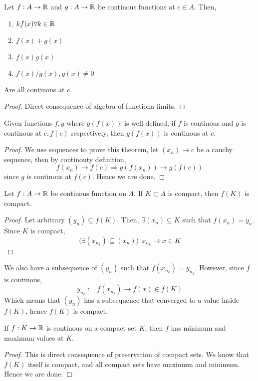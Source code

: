 \begin{theorem}
    Let $f: A \to {\mathbb{R}}$ and $g: A \to {\mathbb{R}}$ be continous functions at $c \in A$. Then,
    \begin{enumerate}
        \item $kf(x) \forall k \in {\mathbb{R}}$
        \item $f(x) +g(x)$
        \item $f(x)g(x)$
        \item $f(x)/g(x), g(x) \neq 0$
    \end{enumerate}
    Are all continous at $c$.
    \begin{proof}
        Direct consequence of algebra of functiona limits.
    \end{proof}
\end{theorem}
\begin{theorem}
    Given functions $f,g$ where  $g(f(x))$ is well defined, if $f$ is continous and $g$ is continous at $c,f(c)$ respectively, then $g(f(x))$ is continous at $c$.
    \begin{proof}
        We use sequences to prove this theorem, let $(x_n) \to c$ be a cauchy sequence, then by continouty definition,
        \[ f(x_n) \to f(c) \Rightarrow g(f(x_n)) \to g(f(c))\]
        since $g$ is continous at $f(c)$. Hence we are done.
    \end{proof}
\end{theorem}
\begin{theorem} Let $f: A \to {\mathbb{R}}$ be continous function on $A$. If $K \subset A$ is compact, then $f(K)$ is compact.
    \begin{proof}
        Let arbitrary $(y_n) \subseteq f(K)$. Then, $\exists (x_n) \subseteq K$ such that $f(x_n) = y_n$. Since $K$ is compact,
        \[ \bigg(\exists (x_{n_k}) \subseteq (x_n)\bigg) \:\ x_{n_k}\to x \in K\]
    \end{proof}
    We also have a subsequence of $(y_n)$ such that $f(x_{n_k}) = y_{n_k}$. However, since $f$ is continous,
    \[ y_{n_k} := f(x_{n_k}) \to f(x) \in f(K)\]
    Which means that $(y_n)$ has a subsequence that converged to a value inside $f(K)$, hence $f(K)$ is compact.
\end{theorem}
\begin{theorem} If $f:K \to {\mathbb{R}}$ is continous on a compact set $K$, then $f$ has minimum and maximum values at $K$.
    \begin{proof}
        This is direct consequence of preservation of compact sets. We know that $f(K)$ itself is compact, and all compact sets have maximum and minimum. Hence we are done.
    \end{proof}
\end{theorem}
